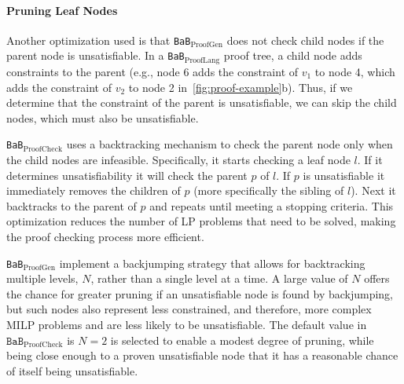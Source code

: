 \documentclass[oneside,11pt,dvipsnames]{book}
\numberwithin{equation}{section}
\theoremstyle{definition}
\theoremstyle{remark}
\newcommand{\proofgen}{\texttt{BaB$_{\text{ProofGen}}$}}
\newcommand{\prooflang}{\texttt{BaB$_{\text{ProofLang}}$}}
\newcommand{\proofcheck}{\texttt{BaB$_{\text{ProofCheck}}$}}
\begin{document}



\paragraph{Pruning Leaf Nodes}

Another optimization used is that \proofgen{} does not check child nodes if the parent node is unsatisfiable.
In a \prooflang{} proof tree, a child node adds constraints to the parent (e.g., node 6 adds the constraint of $v_1$ to node 4, which adds the constraint of $v_2$ to node 2 in~\autoref{fig:proof-example}b). Thus, if we determine that the constraint of the parent is unsatisfiable, we can skip the child nodes, which must also be unsatisfiable.


\proofcheck{} uses a backtracking mechanism to check the parent node only when the child nodes are infeasible. Specifically, it starts checking a leaf node $l$. If it determines unsatisfiability it will check the parent $p$ of $l$. If $p$ is unsatisfiable it immediately removes the children of $p$ (more specifically the sibling of $l$). Next it backtracks to the parent of $p$ and repeats until meeting a stopping criteria. This optimization reduces the number of LP problems that need to be solved, making the proof checking process more efficient.

\proofgen{} implement a backjumping strategy that allows for backtracking multiple levels, $N$, rather than a single level at a time.
A large value of $N$ offers the chance for greater pruning if an unsatisfiable node is found by
backjumping, but such nodes also represent less constrained, and therefore, more complex MILP problems
and are less likely to be unsatisfiable.
The default value in $\proofcheck{}$ is $N=2$ is selected to enable a modest degree of pruning,
while being close enough to a proven unsatisfiable node that it has a reasonable chance of itself being unsatisfiable.
\end{document}
